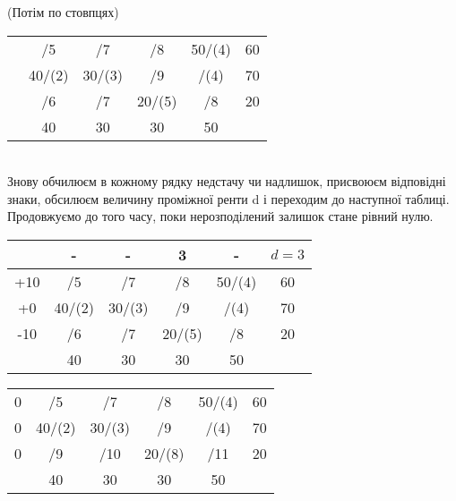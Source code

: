 \documentclass[12pt]{book}
\begin{document}
(Потім по стовпцях)
\begin{tabular}{ | c | c | c | c | c | c | }
\hline
	&		&		&		&		&\\
\hline
	&	/5	&	/7	&	/8	&	50/(4)	&	60\\
\hline
	&	40/(2)	&	30/(3)	&	/9	&	/(4)	&	70\\
\hline
	&	/6	&	/7	&	20/(5)	&	/8	&	20\\
\hline
	&	40	&	30	&	30	&	50	&\\
\hline
\end{tabular}\\
Знову обчилюєм в кожному рядку недстачу чи надлишок, присвоюєм відповідні знаки, обсилюєм величину проміжної ренти d і переходим до наступної таблиці. Продовжуємо до того часу, поки нерозподілений залишок стане рівний нулю.\\
\begin{tabular}{ | c | c | c | c | c | c | }
\hline
	&	-	&	-	&	3	&	-	&	$d=3$\\
\hline
+10	&	/5	&	/7	&	/8	&	50/(4)	&	60\\
\hline
+0	&	40/(2)	&	30/(3)	&	/9	&	/(4)	&	70\\
\hline
-10	&	/6	&	/7	&	20/(5)	&	/8	&	20\\
\hline
	&	40	&	30	&	30	&	50	&\\
\hline
\end{tabular}
\rightarrow
\begin{tabular}{ | c | c | c | c | c | c | }
\hline
	&		&		&		&		&\\
\hline
0	&	/5	&	/7	&	/8	&	50/(4)	&	60\\
\hline
0	&	40/(2)	&	30/(3)	&	/9	&	/(4)	&	70\\
\hline
0	&	/9	&	/10	&	20/(8)	&	/11	&	20\\
\hline
	&	40	&	30	&	30	&	50	&\\
\hline
\end{tabular}\\
\end{document}
